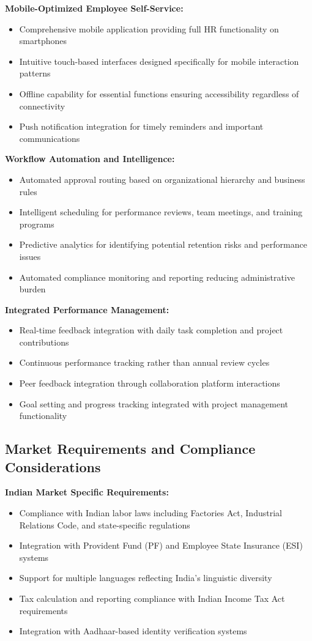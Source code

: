 \textbf{Mobile-Optimized Employee Self-Service:}
\begin{itemize}
    \item Comprehensive mobile application providing full HR functionality on smartphones
    \item Intuitive touch-based interfaces designed specifically for mobile interaction patterns
    \item Offline capability for essential functions ensuring accessibility regardless of connectivity
    \item Push notification integration for timely reminders and important communications
\end{itemize}

\textbf{Workflow Automation and Intelligence:}
\begin{itemize}
    \item Automated approval routing based on organizational hierarchy and business rules
    \item Intelligent scheduling for performance reviews, team meetings, and training programs
    \item Predictive analytics for identifying potential retention risks and performance issues
    \item Automated compliance monitoring and reporting reducing administrative burden
\end{itemize}

\textbf{Integrated Performance Management:}
\begin{itemize}
    \item Real-time feedback integration with daily task completion and project contributions
    \item Continuous performance tracking rather than annual review cycles
    \item Peer feedback integration through collaboration platform interactions
    \item Goal setting and progress tracking integrated with project management functionality
\end{itemize}

\subsection{Market Requirements and Compliance Considerations}

\textbf{Indian Market Specific Requirements:}
\begin{itemize}
    \item Compliance with Indian labor laws including Factories Act, Industrial Relations Code, and state-specific regulations
    \item Integration with Provident Fund (PF) and Employee State Insurance (ESI) systems
    \item Support for multiple languages reflecting India's linguistic diversity
    \item Tax calculation and reporting compliance with Indian Income Tax Act requirements
    \item Integration with Aadhaar-based identity verification systems
\end{itemize}

